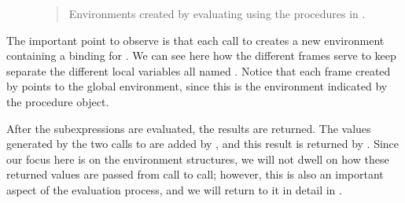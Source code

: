 \begin{figure}[tb]
\label{Figure 3.5}
\centering
\begin{comment}
\heading{Figure 3.5:} Environments created by evaluating
\code{(f 5)} using the procedures in \link{Figure 3.4}.

\begin{example}
          +-----------------------------------------------------+
global -->|                                                     |
env       +-----------------------------------------------------+
            ^              ^                ^               ^
(f 5)       |              |                |               |
        +------+       +-------+        +------+        +-------+
  E1 -->| a: 5 |  E2 ->| x: 6  |  E3 -->| x: 6 |  E4 -->| x: 10 |
        |      |       | y: 10 |        |      |        |       |
        +------+       +-------+        +------+        +-------+
   (sum-of-squares   (+ (square x)       (* x x)         (* x x)
     (+ a 1)            (square u))
     (+ a 2))
\end{example}
\end{comment}

\begin{quote}
 Environments created by evaluating  using the procedures in .
\end{quote}
\end{figure}

The important point to observe is that each call to  creates a new
environment containing a binding for .  We can see here how the
different frames serve to keep separate the different local variables all named
.  Notice that each frame created by  points to the global
environment, since this is the environment indicated by the 
procedure object.

After the subexpressions are evaluated, the results are returned.  The values
generated by the two calls to  are added by ,
and this result is returned by .  Since our focus here is on the
environment structures, we will not dwell on how these returned values are
passed from call to call; however, this is also an important aspect of the
evaluation process, and we will return to it in detail in .


